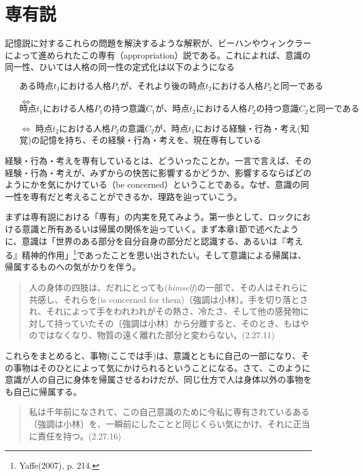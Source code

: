 \documentclass[a4j,oneside]{jsbook}
\begin{document}
\section{
専有説
}
記憶説に対するこれらの問題を解決するような解釈が、ビーハンやウィンクラーによって進められたこの専有（appropriation）説である。これによれば、意識の同一性、ひいては人格の同一性の定式化は以下のようになる
\begin{itemize}
\item[]$ある時点t_1における人格P_1が、それより後の時点t_2における人格P_2と同一である$
\item[$\iff$]$時点t_1における人格P_1の持つ意識C_1が、時点t_2における人格P_2の持つ意識C_2と同一である$
\item[$\iff$]$時点t_2における人格P_2の意識C_2が、時点t_1$における経験・行為・考え(知覚)の記憶を持ち、その経験・行為・考えを、現在専有している
\end{itemize}
経験・行為・考えを専有しているとは、どういったことか。一言で言えば、その経験・行為・考えが、みずからの快苦に影響するかどうか、影響するならばどのようにかを気にかけている（be concerned）ということである。なぜ、意識の同一性を専有だと考えることができるか、理路を辿っていこう。
\par
まずは専有説における「専有」の内実を見てみよう。第一歩として、ロックにおける意識と所有あるいは帰属の関係を辿っていく。まず本章1節で述べたように、意識は「世界のある部分を自分自身の部分だと認識する、あるいは『考える』精神的作用」\footnote{Yaffe(2007), p. 214.}であったことを思い出されたい。そして意識による帰属は、帰属するものへの気がかりを伴う。
\begin{quote}
人の身体の四肢は、だれにとっても({\itshape himself})の一部で、その人はそれらに共感し、それらを(is concerned for them)〔強調は小林〕。手を切り落とされ、それによって手をわれわれがその熱さ、冷たさ、そして他の感発物に対して持っていたその〔強調は小林〕から分離すると、そのとき、もはやのではなくなり、物質の遠く離れた部分と変わらない。(2.27.11)
\end{quote}
これらをまとめると、事物(ここでは手)は、意識とともに自己の一部になり、その事物はそのひとによって気にかけられるということになる。さて、このように意識が人の自己に身体を帰属させるわけだが、同じ仕方で人は身体以外の事物をも自己に帰属する。
\begin{quote}
私は千年前になされて、この自己意識のために今私に専有されているある〔強調は小林〕を、一瞬前にしたことと同じくらい気にかけ、それに正当に責任を持つ。(2.27.16)
\end{quote}
\end{document}
